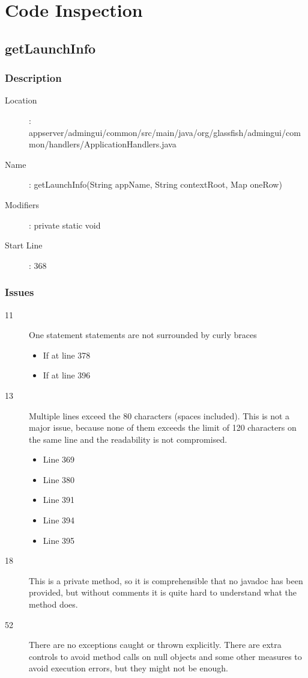 \section{Code Inspection}
\subsection{getLaunchInfo}
	\subsubsection{Description}
	\begin{description}
	\item[Location]: appserver/admingui/common/src/main/java/org/glassfish/admingui/common/handlers/ApplicationHandlers.java
	\item[Name]: getLaunchInfo(String appName, String contextRoot, Map oneRow)
	\item[Modifiers]: private static void
	\item[Start Line]: 368
	\end{description}
	\subsubsection{Issues}
	\begin{description}
		\item[11] One statement statements are not surrounded by curly braces
			\begin{itemize}
			\item If at line 378
			\item If at line 396
			\end{itemize}
		\item[13] Multiple lines exceed the 80 characters (spaces included).
			This is not a major issue, because none of them	exceeds the limit of 120 characters on the same line and
			the readability is not compromised.
			\begin{itemize}
				\item Line 369
				\item Line 380
				\item Line 391
				\item Line 394
				\item Line 395
			\end{itemize}
		\item[18] This is a private method, so it is comprehensible that no javadoc has been provided, but
		without comments it is quite hard to understand what the method does.
		\item[52] There are no exceptions caught or thrown explicitly. There are extra controls to avoid method
		calls on null objects and some other measures to avoid execution errors, but they might not be enough.
	\end{description}
